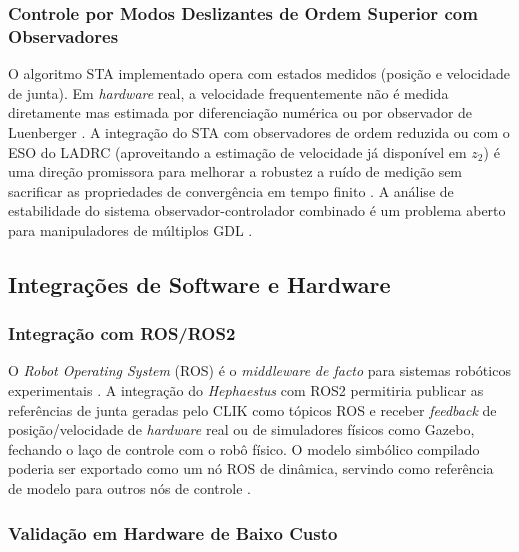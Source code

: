 \subsubsection*{Controle por Modos Deslizantes de Ordem Superior com Observadores}

O algoritmo STA implementado opera com estados medidos (posição e velocidade de junta). Em \textit{hardware} real, a velocidade frequentemente não é medida diretamente mas estimada por diferenciação numérica ou por observador de Luenberger \cite{ogata2010modern}. A integração do STA com observadores de ordem reduzida ou com o ESO do LADRC (aproveitando a estimação de velocidade já disponível em $z_2$) é uma direção promissora para melhorar a robustez a ruído de medição sem sacrificar as propriedades de convergência em tempo finito \cite{levant2003higher, shtessel2014sliding, moreno2012strict}. A análise de estabilidade do sistema observador-controlador combinado é um problema aberto para manipuladores de múltiplos GDL \cite{utkin2017sliding}.

\subsection{Integrações de Software e Hardware}

\subsubsection*{Integração com ROS/ROS2}

O \textit{Robot Operating System} (ROS) é o \textit{middleware} \textit{de facto} para sistemas robóticos experimentais \cite{corke2017robotics}. A integração do \textit{Hephaestus} com ROS2 permitiria publicar as referências de junta geradas pelo CLIK como tópicos ROS e receber \textit{feedback} de posição/velocidade de \textit{hardware} real ou de simuladores físicos como Gazebo, fechando o laço de controle com o robô físico. O modelo simbólico compilado poderia ser exportado como um nó ROS de dinâmica, servindo como referência de modelo para outros nós de controle \cite{leu1986automated}.

\subsubsection*{Validação em Hardware de Baixo Custo}

